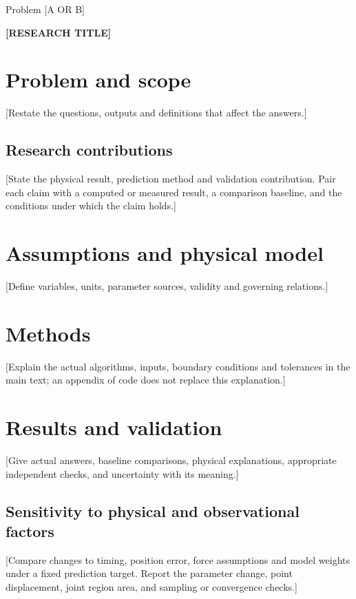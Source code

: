 \documentclass[11pt,a4paper]{article}
\newcommand{\ProblemLetter}{[A OR B]}
\newcommand{\PaperTitle}{[RESEARCH TITLE]}
\begin{document}
\begin{titlepage}
\thispagestyle{summary}
\begin{center}
Problem \ProblemLetter

\vspace{1em}
{\Large\bfseries \PaperTitle\par}
\end{center}
\begin{abstract}
[Replace with a self-contained summary of at most the current word limit
(300 words in the rules verified on 2026-11-07). State the problem,
method and key assumptions, direct answers, principal numerical results
with units, and material conditions. Count the final abstract separately.]
\end{abstract}
\end{titlepage}
\setcounter{page}{2}
\section{Problem and scope}
[Restate the questions, outputs and definitions that affect the answers.]
\subsection{Research contributions}
[State the physical result, prediction method and validation contribution.
Pair each claim with a computed or measured result, a comparison baseline,
and the conditions under which the claim holds.]
\section{Assumptions and physical model}
[Define variables, units, parameter sources, validity and governing relations.]
\section{Methods}
[Explain the actual algorithms, inputs, boundary conditions and tolerances
in the main text; an appendix of code does not replace this explanation.]
\section{Results and validation}
[Give actual answers, baseline comparisons, physical explanations,
appropriate independent checks, and uncertainty with its meaning.]
\subsection{Sensitivity to physical and observational factors}
[Compare changes to timing, position error, force assumptions and model
weights under a fixed prediction target. Report the parameter change,
point displacement, joint region area, and sampling or convergence checks.]
\end{document}
